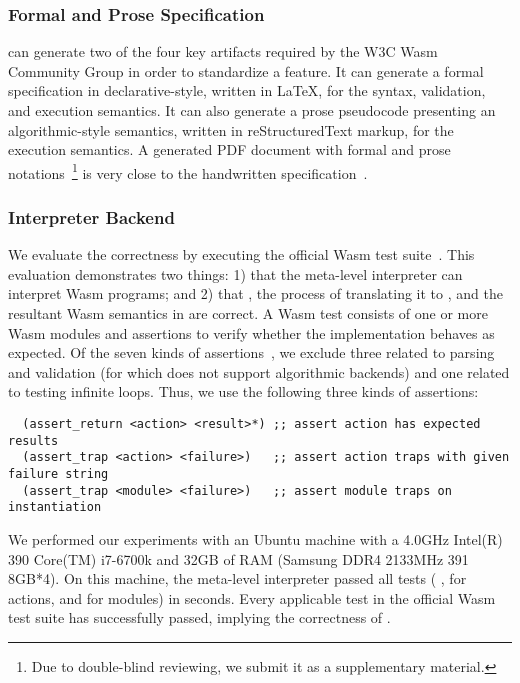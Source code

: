 \subsubsection*{Formal and Prose Specification}
\dslname can generate two of the four key artifacts required by the W3C Wasm
Community Group in order to standardize a feature.
It can generate a formal specification in declarative-style, written in LaTeX,
for the syntax, validation, and execution semantics.
It can also generate a prose pseudocode presenting an algorithmic-style semantics,
written in reStructuredText markup, for the execution semantics.
A generated PDF document with formal and prose
notations~\cite{specdsl}\footnote{Due to double-blind reviewing,
we submit it as a supplementary material.} is very close to the
handwritten specification~\cite{wasmspec}.

\subsubsection*{Interpreter Backend}
We evaluate the correctness by executing the official Wasm test suite~\cite{wasmtest}.
This evaluation demonstrates two things: 1) that the meta-level interpreter can interpret
Wasm programs; and 2) that \specdsl, the process of translating it to \al, and
the resultant Wasm semantics in \al are correct.
A Wasm test consists of one or more Wasm modules and
assertions to verify whether the implementation behaves as expected.
Of the seven kinds of assertions~\cite{wast},
we exclude three related to parsing and validation
(for which \dslname does not support algorithmic backends)
and one related to testing infinite loops.
Thus, we use the following three kinds of assertions:

{\small
\begin{verbatim}
  (assert_return <action> <result>*) ;; assert action has expected results
  (assert_trap <action> <failure>)   ;; assert action traps with given failure string
  (assert_trap <module> <failure>)   ;; assert module traps on instantiation
\end{verbatim}
}

\noindent
We performed our experiments with an Ubuntu machine with a 4.0GHz
Intel(R) 390 Core(TM) i7-6700k and 32GB of RAM (Samsung DDR4 2133MHz 391 8GB*4).
On this machine, the meta-level interpreter passed all  tests
( ,
  for actions, and
  for modules)
in  seconds.
Every applicable test in the official Wasm test suite has successfully passed,
implying the correctness of \dslname.

